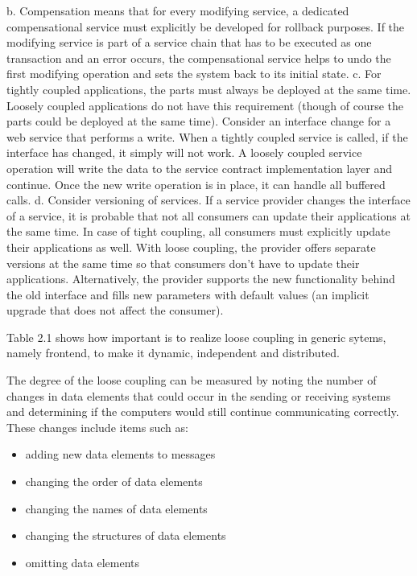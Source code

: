 \newline
b. Compensation means that for every modifying service, a dedicated compensational service must explicitly be developed for rollback purposes. If the modifying service is part of a service chain that has to be executed as one transaction and an error occurs, the compensational service helps to undo the first modifying operation and sets the system back to its initial state. 
\newline
c. For tightly coupled applications, the parts must always be deployed at the same time. Loosely coupled applications do not have this requirement (though of course the parts could be deployed at the same time). Consider an interface change for a web service that performs a write. When a tightly coupled service is called, if the interface has changed, it simply will not work. A loosely coupled service operation will write the data to the service contract implementation layer and continue. Once the new write operation is in place, it can handle all buffered calls. 
\newline
d. Consider versioning of services. If a service provider changes the interface of a service, it is probable that not all consumers can update their applications at the same time. In case of tight coupling, all consumers must explicitly update their applications as well. With loose coupling, the provider offers separate versions at the same time so that consumers don't have to update their applications. Alternatively, the provider supports the new functionality behind the old interface and fills new parameters with default values (an implicit upgrade that does not affect the consumer).

Table 2.1 shows how important is to realize loose coupling in generic sytems, namely frontend, to make it dynamic, independent and distributed.

The degree of the loose coupling can be measured by noting the number of changes in data elements that could occur in the sending or receiving systems and determining if the computers would still continue communicating correctly\cite{firestone1984study,danneels2003tight}. These changes include items such as:
\begin{itemize}
\item adding new data elements to messages
\item changing the order of data elements
\item changing the names of data elements
\item changing the structures of data elements
\item omitting data elements
\end{itemize}

